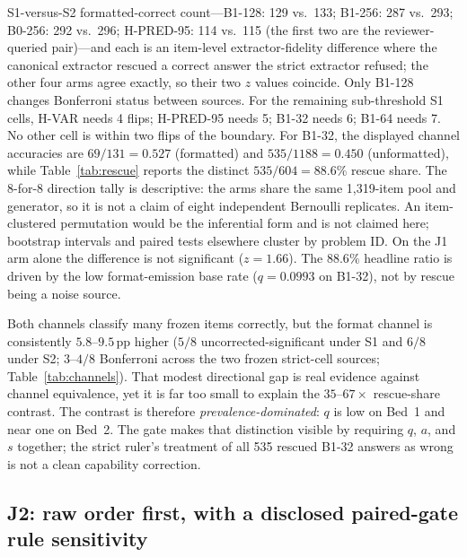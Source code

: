 \documentclass{article}
\newcommand{\pp}{\,\mathrm{pp}}
\begin{document}
\begin{table}[!tb]
{S1-versus-S2 formatted-correct count---\textsc{B1-128}: 129 vs.\ 133;
\textsc{B1-256}: 287 vs.\ 293; \textsc{B0-256}: 292 vs.\ 296;
\textsc{H-PRED-95}: 114 vs.\ 115 (the first two are the reviewer-queried
pair)---and each is an item-level extractor-fidelity difference where the
canonical extractor rescued a correct answer the strict extractor refused;
the other four arms agree exactly, so their two $z$ values coincide.
Only \textsc{B1-128} changes Bonferroni status between sources.  For the
remaining sub-threshold S1 cells, \textsc{H-VAR} needs 4 flips;
\textsc{H-PRED-95} needs 5; \textsc{B1-32} needs 6; \textsc{B1-64} needs 7.
No other cell is within two flips of the boundary.
For \textsc{B1-32}, the displayed channel accuracies are
$69/131=0.527$ (formatted) and $535/1188=0.450$ (unformatted), while
Table~\ref{tab:rescue} reports the distinct $535/604=88.6\%$ rescue share.
The 8-for-8 direction tally is descriptive: the arms share the same 1,319-item
pool and generator, so it is not a claim of eight independent Bernoulli
replicates.  An item-clustered permutation would be the inferential form and is
not claimed here; bootstrap intervals and paired tests elsewhere cluster by
problem ID.  On the J1 arm alone the
difference is not significant ($z{=}1.66$).  The $88.6\%$ headline ratio
is driven by the low format-emission base rate ($q{=}0.0993$ on
\textsc{B1-32}), not by rescue being a noise source.}\label{tab:channels}
\end{table}

Both channels classify many frozen items correctly, but the format channel is
consistently $5.8$--$9.5\pp$ higher ($5/8$ uncorrected-significant under S1 and
$6/8$ under S2; $3$--$4/8$ Bonferroni across the two frozen strict-cell sources;
Table~\ref{tab:channels}).  That modest directional gap is
real evidence against channel equivalence, yet it is far too small to explain
the $35$--$67\times$ rescue-share contrast.  The contrast is therefore
\emph{prevalence-dominated}: $q$ is low on Bed~1 and near one on Bed~2.  The
gate makes that distinction visible by requiring $q$, $a$, and $s$ together;
the strict ruler's treatment of all 535 rescued \textsc{B1-32} answers as
wrong is not a clean capability correction.

\subsection{J2: raw order first, with a disclosed paired-gate rule sensitivity}\label{sec:j2}
\end{document}
